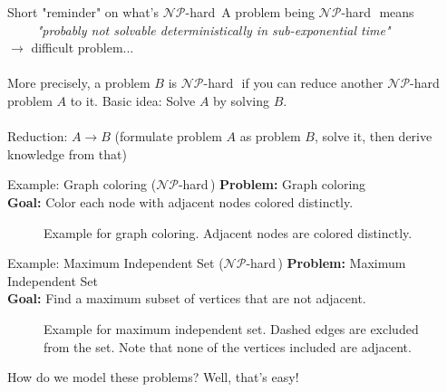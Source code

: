 \documentclass[10pt]{beamer}
\newcommand{\nphard}{$\mathcal{NP}$-hard\,}
\begin{document}
\begin{frame}{Short "reminder" on what's \nphard}
A problem being \nphard\, means \\$\qquad$ \textit{"probably not solvable deterministically in sub-exponential time"}\\ $\rightarrow$ difficult problem...\\\,\\
More precisely, a problem $B$ is \nphard\, if you can reduce another \nphard problem $A$ to it. Basic idea: Solve $A$ by solving $B$.\\\,\\
Reduction: $A \rightarrow B$ (formulate problem $A$ as problem $B$, solve it, then derive knowledge from that)
\end{frame}

\begin{frame}{Example: Graph coloring (\nphard)}
\textbf{Problem:} Graph coloring\\
\textbf{Goal:} Color each node with adjacent nodes colored distinctly.\\

\begin{figure}
	\centering
	\scalebox{0.6}{\chromaticNumber}
	\caption{Example for graph coloring. Adjacent nodes are colored distinctly.}
\end{figure}
\end{frame}



\begin{frame}{Example: Maximum Independent Set (\nphard)}
\textbf{Problem:} Maximum Independent Set\\
\textbf{Goal:} Find a maximum subset of vertices that are not adjacent.\\

\begin{figure}
	\centering
	\scalebox{0.8}{\maxIndependentSet}
	\caption{Example for maximum independent set. Dashed edges are excluded from the set. Note that none of the vertices included are adjacent.}
\end{figure}
\end{frame}

\begin{frame}{How do we model these problems?}
Well, that's easy!\\\,\\


\end{frame}
\end{document}
